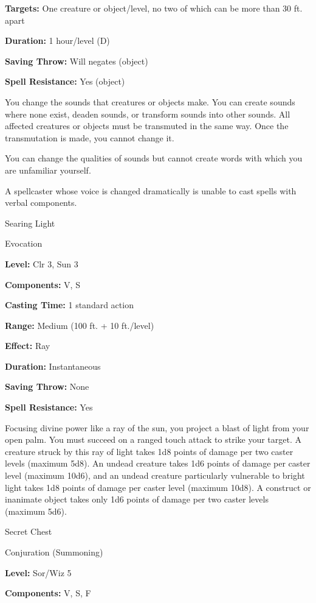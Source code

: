 \documentclass{article}
\begin{document}
\textbf{Targets:} One creature or object/level, no two of which can be more than 
30 ft. apart

\textbf{Duration:} 1 hour/level (D)

\textbf{Saving Throw: }Will negates (object)

\textbf{Spell Resistance:} Yes (object)

You change the sounds that creatures or objects make. You can create sounds where 
none exist, deaden sounds, or transform sounds into other sounds. All affected 
creatures or objects must be transmuted in the same way. Once the transmutation 
is made, you cannot change it.

You can change the qualities of sounds but cannot create words with which you are 
unfamiliar yourself.

A spellcaster whose voice is changed dramatically is unable to cast spells with 
verbal components.

\vspace{12pt}
Searing Light

Evocation

\textbf{Level:} Clr 3, Sun 3

\textbf{Components:} V, S

\textbf{Casting Time:} 1 standard action

\textbf{Range: }Medium (100 ft. + 10 ft./level)

\textbf{Effect:} Ray

\textbf{Duration:} Instantaneous

\textbf{Saving Throw:} None

\textbf{Spell Resistance:} Yes

Focusing divine power like a ray of the sun, you project a blast of light from 
your open palm. You must succeed on a ranged touch attack to strike your target. 
A creature struck by this ray of light takes 1d8 points of damage per two caster 
levels (maximum 5d8). An undead creature takes 1d6 points of damage per caster 
level (maximum 10d6), and an undead creature particularly vulnerable to bright 
light takes 1d8 points of damage per caster level (maximum 10d8). A construct or 
inanimate object takes only 1d6 points of damage per two caster levels (maximum 
5d6).

\vspace{12pt}
Secret Chest

Conjuration (Summoning)

\textbf{Level:} Sor/Wiz 5

\textbf{Components:} V, S, F
\end{document}
